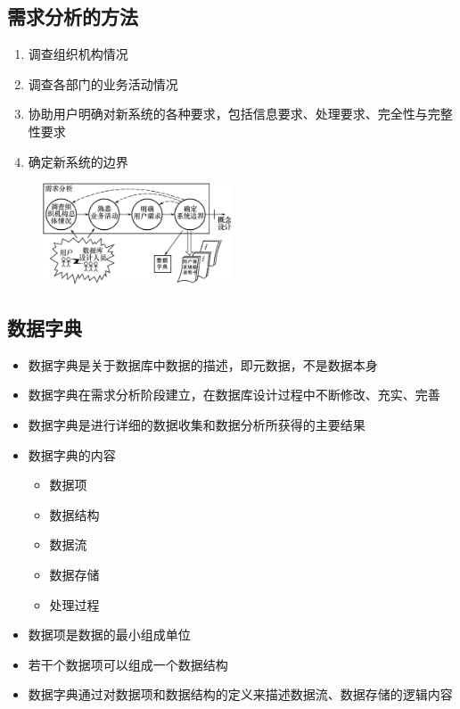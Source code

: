 \subsection{需求分析的方法}
\begin{enumerate}[label=\arabic*.]
    \item 调查组织机构情况
    \item 调查各部门的业务活动情况
    \item 协助用户明确对新系统的各种要求，包括信息要求、处理要求、完全性与完整性要求
    \item 确定新系统的边界
\end{enumerate}
\begin{figure}[H]
    \vspace{-0.5em}
	\centering
	\includegraphics[width=0.5\textwidth]{images/7.2.2}
    \vspace{-1em}
\end{figure}

\subsection{数据字典}
\begin{itemize}
    \item 数据字典是关于数据库中数据的描述，即元数据，不是数据本身
    \item 数据字典在需求分析阶段建立，在数据库设计过程中不断修改、充实、完善
    \item 数据字典是进行详细的数据收集和数据分析所获得的主要结果 
    \item 数据字典的内容
    \vspace{-0.8em}
	\begin{multicols}{3}
        \begin{itemize}
            \item 数据项
            \item 数据结构
            \item 数据流
            \item 数据存储
            \item 处理过程
        \end{itemize}
	\end{multicols}
	\vspace{-1em}
    \item 数据项是数据的最小组成单位
    \item 若干个数据项可以组成一个数据结构
    \item 数据字典通过对数据项和数据结构的定义来描述数据流、数据存储的逻辑内容
\end{itemize}

